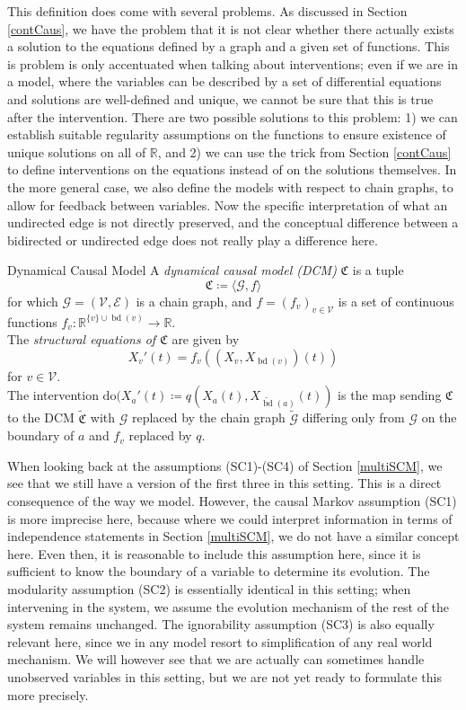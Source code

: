 \documentclass[11pt, a4paper]{memoir}
\theoremstyle{break}
\theoremstyle{break}
\theoremstyle{nonumberplain}
\newcommand{\mR}{\mathbb{R}}
\DeclareMathOperator{\bd}{bd}
\begin{document}
This definition does come with several problems. As discussed in Section \ref{contCaus}, we have the problem that it is not clear whether there actually exists a solution to the equations defined by a graph and a given set of functions. This is problem is only accentuated when talking about interventions; even if we are in a model, where the variables can be described by a set of differential equations and solutions are well-defined and unique, we cannot be sure that this is true after the intervention. There are two possible solutions to this problem: 1) we can establish suitable regularity assumptions on the functions to ensure existence of unique solutions on all of $\mR$, and 2) we can use the trick from Section \ref{contCaus} to define interventions on the equations instead of on the solutions themselves. In the more general case, we also define the models with respect to chain graphs, to allow for feedback between variables. Now the specific interpretation of what an undirected edge is not directly preserved, and the conceptual difference between a bidirected or undirected edge does not really play a difference here.
\begin{mydefinition}{Dynamical Causal Model}
A \emph{dynamical causal model (DCM)} $\mathfrak{C}$ is a tuple
$$\mathfrak{C}\coloneqq \langle \mathcal{G}, f\rangle$$
for which $\mathcal{G}=(\mathcal{V},\mathcal{E})$ is a chain graph, and $f=(f_v)_{v\in \mathcal{V}}$ is a set of continuous functions $f_v:\mR^{\{v\}\cup \bd(v)}\to \mR$.\\[5pt]
The \emph{structural equations of $\mathfrak{C}$} are given by
$$X_v'(t)=f_v((X_v,X_{\bd(v)})(t))$$
for $v\in \mathcal{V}$.\\[5pt]
The intervention $\text{do}(X_a'(t)\coloneqq q(X_a(t),X_{\tilde{\bd}(a)}(t))$ is the map sending $\mathfrak{C}$ to the DCM $\tilde{\mathfrak{C}}$ with $\mathcal{G}$ replaced by the chain graph $\tilde{\mathcal{G}}$ differing only from $\mathcal{G}$ on the boundary of $a$ and $f_v$ replaced by $q$.
\end{mydefinition}
When looking back at the assumptions (SC1)-(SC4) of Section \ref{multiSCM}, we see that we still have a version of the first three in this setting. This is a direct consequence of the way we model. However, the causal Markov assumption (SC1) is more imprecise here, because where we could interpret information in terms of independence statements in Section \ref{multiSCM}, we do not have a similar concept here. Even then, it is reasonable to include this assumption here, since it is sufficient to know the boundary of a variable to determine its evolution. The modularity assumption (SC2) is essentially identical in this setting; when intervening in the system, we assume the evolution mechanism of the rest of the system remains unchanged. The ignorability assumption (SC3) is also equally relevant here, since we in any model resort to simplification of any real world mechanism. We will however see that we are actually can sometimes handle unobserved variables in this setting, but we are not yet ready to formulate this more precisely.\\\\
\end{document}
